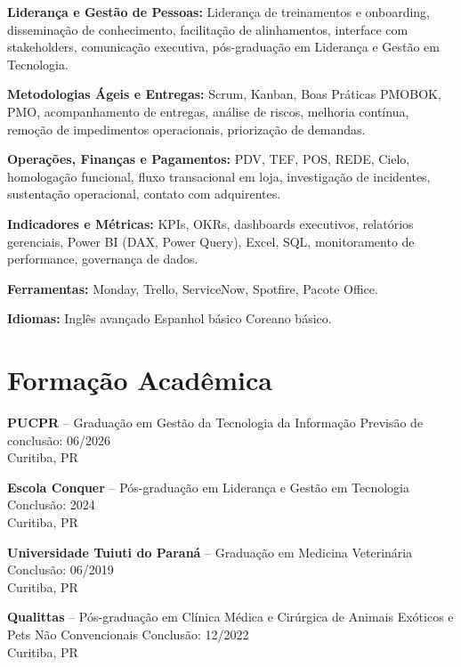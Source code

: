 \documentclass[11pt,a4paper]{article}
\begin{document}
\textbf{Liderança e Gestão de Pessoas:} Liderança de treinamentos e onboarding, disseminação de conhecimento, facilitação de alinhamentos, interface com stakeholders, comunicação executiva, pós-graduação em Liderança e Gestão em Tecnologia.

\textbf{Metodologias Ágeis e Entregas:} Scrum, Kanban, Boas Práticas PMOBOK, PMO, acompanhamento de entregas, análise de riscos, melhoria contínua, remoção de impedimentos operacionais, priorização de demandas.

\textbf{Operações, Finanças e Pagamentos:} PDV, TEF, POS, REDE, Cielo, homologação funcional, fluxo transacional em loja, investigação de incidentes, sustentação operacional, contato com adquirentes.

\textbf{Indicadores e Métricas:} KPIs, OKRs, dashboards executivos, relatórios gerenciais, Power BI (DAX, Power Query), Excel, SQL, monitoramento de performance, governança de dados.

\textbf{Ferramentas:} Monday, Trello, ServiceNow, Spotfire, Pacote Office.

\textbf{Idiomas:} Inglês avançado \textbullet{} Espanhol básico \textbullet{} Coreano básico.

\section*{Formação Acadêmica}

\textbf{PUCPR} -- Graduação em Gestão da Tecnologia da Informação \hfill Previsão de conclusão: 06/2026\\
Curitiba, PR

\textbf{Escola Conquer} -- Pós-graduação em Liderança e Gestão em Tecnologia \hfill Conclusão: 2024\\
Curitiba, PR

\textbf{Universidade Tuiuti do Paraná} -- Graduação em Medicina Veterinária \hfill Conclusão: 06/2019\\
Curitiba, PR

\textbf{Qualittas} -- Pós-graduação em Clínica Médica e Cirúrgica de Animais Exóticos e Pets Não Convencionais \hfill Conclusão: 12/2022\\
Curitiba, PR
\end{document}
